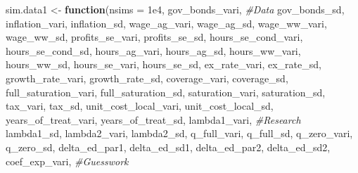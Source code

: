 \documentclass[]{article}
\newenvironment{Shaded}{\begin{snugshade}}{\end{snugshade}}
\newcommand{\CommentTok}[1]{\textcolor[rgb]{0.56,0.35,0.01}{\textit{#1}}}
\newcommand{\ControlFlowTok}[1]{\textcolor[rgb]{0.13,0.29,0.53}{\textbf{#1}}}
\newcommand{\DataTypeTok}[1]{\textcolor[rgb]{0.13,0.29,0.53}{#1}}
\newcommand{\FloatTok}[1]{\textcolor[rgb]{0.00,0.00,0.81}{#1}}
\newcommand{\NormalTok}[1]{#1}
\newcommand{\StringTok}[1]{\textcolor[rgb]{0.31,0.60,0.02}{#1}}
\begin{document}
\begin{Shaded}
\begin{Highlighting}[]
\NormalTok{sim.data1 <-}\StringTok{ }\ControlFlowTok{function}\NormalTok{(}\DataTypeTok{nsims =} \FloatTok{1e4}\NormalTok{, }
\NormalTok{                      gov_bonds_vari,                }\CommentTok{#Data}
\NormalTok{                      gov_bonds_sd,}
\NormalTok{                      inflation_vari,}
\NormalTok{                      inflation_sd,}
\NormalTok{                      wage_ag_vari,}
\NormalTok{                      wage_ag_sd,}
\NormalTok{                      wage_ww_vari,}
\NormalTok{                      wage_ww_sd,}
\NormalTok{                      profits_se_vari,}
\NormalTok{                      profits_se_sd,}
\NormalTok{                      hours_se_cond_vari,}
\NormalTok{                      hours_se_cond_sd,}
\NormalTok{                      hours_ag_vari, }
\NormalTok{                      hours_ag_sd,}
\NormalTok{                      hours_ww_vari,}
\NormalTok{                      hours_ww_sd,}
\NormalTok{                      hours_se_vari,}
\NormalTok{                      hours_se_sd,}
\NormalTok{                      ex_rate_vari,}
\NormalTok{                      ex_rate_sd,}
\NormalTok{                      growth_rate_vari, }
\NormalTok{                      growth_rate_sd, }
\NormalTok{                      coverage_vari,}
\NormalTok{                      coverage_sd,}
\NormalTok{                      full_saturation_vari, }
\NormalTok{                      full_saturation_sd, }
\NormalTok{                      saturation_vari,}
\NormalTok{                      saturation_sd,}
\NormalTok{                      tax_vari, }
\NormalTok{                      tax_sd, }
\NormalTok{                      unit_cost_local_vari, }
\NormalTok{                      unit_cost_local_sd, }
\NormalTok{                      years_of_treat_vari,}
\NormalTok{                      years_of_treat_sd,}
\NormalTok{                      lambda1_vari,                   }\CommentTok{#Research}
\NormalTok{                      lambda1_sd, }
\NormalTok{                      lambda2_vari,}
\NormalTok{                      lambda2_sd,}
\NormalTok{                      q_full_vari, }
\NormalTok{                      q_full_sd,}
\NormalTok{                      q_zero_vari,}
\NormalTok{                      q_zero_sd,}
\NormalTok{                      delta_ed_par1,}
\NormalTok{                      delta_ed_sd1,}
\NormalTok{                      delta_ed_par2,}
\NormalTok{                      delta_ed_sd2,}
\NormalTok{                      coef_exp_vari,                  }\CommentTok{#Guesswork}

\end{Highlighting}
\end{Shaded}
\end{document}

